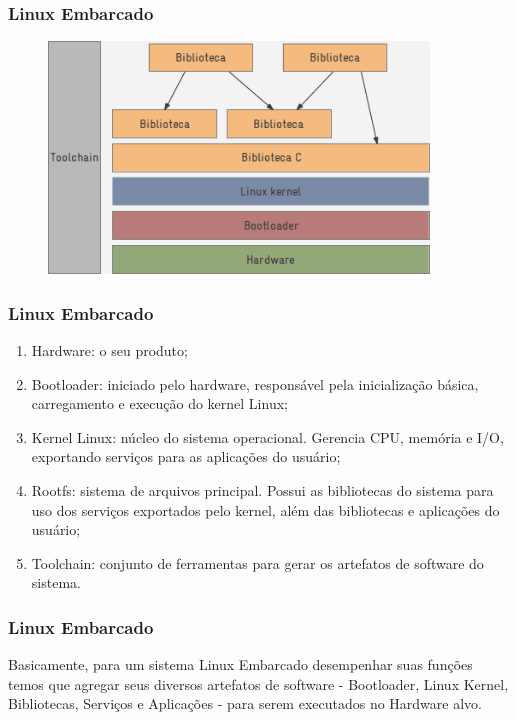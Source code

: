 \begin{frame}
    \frametitle{Linux Embarcado}
    \begin{figure}[htbp]
        \centering
        \includegraphics[width=0.9\textwidth]{images/linux-embarcado.png}        
    \end{figure}
    

\end{frame}

\begin{frame}
    \frametitle{Linux Embarcado}
    \begin{enumerate}
        \item    Hardware: o seu produto;
        \item Bootloader: iniciado pelo hardware, responsável pela inicialização 
        básica, carregamento e execução do kernel Linux;
        \item Kernel Linux: núcleo do sistema operacional. Gerencia CPU, memória
        e I/O, exportando serviços para as aplicações do usuário;
        \item Rootfs: sistema de arquivos principal. Possui as bibliotecas do 
        sistema para uso dos serviços exportados pelo kernel, além das 
        bibliotecas e aplicações do usuário;
        \item Toolchain: conjunto de ferramentas para gerar os artefatos de software
        do sistema.
    
    \end{enumerate}
\end{frame}

\begin{frame}
    \frametitle{Linux Embarcado}
    Basicamente, para um sistema Linux Embarcado desempenhar suas funções
    temos que agregar seus diversos artefatos de software - Bootloader,
    Linux Kernel, Bibliotecas, Serviços e Aplicações - para serem executados
    no Hardware alvo. 
    

\end{frame}

